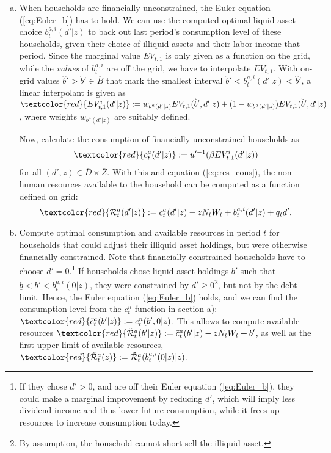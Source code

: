 \documentclass[11pt]{article} %
\newcounter{break}
\begin{document}
\begin{enumerate}[a.)]
\setcounter{enumi}{\value{break}}
\item When households are financially unconstrained, the Euler equation (\ref{eq:Euler_b}) has to hold. We can use the computed optimal liquid asset choice $b_t^{a,i}(d'|z)$ to back out last period's consumption level of these households, given their choice of illiquid assets and their labor income that period. Since the marginal value $EV_{t,1}$ is only given as a function on the grid, while the \textit{values} of $b_t^{a,i}$ are off the grid, we have to interpolate $EV_{t,1}$. With on-grid values $\hat{b}'>\check{b}'\in\overline{B}$ that mark the smallest interval $\check{b}'<b_t^{a,i}(d'|z)<\hat{b}'$, a linear interpolant is given as $\textcolor{red}{EV^i_{t,1}(d'|z)} := w_{b^a(d'|z)} EV_{t,1}(\hat{b}',d'|z) + (1-w_{b^a(d'|z)})EV_{t,1}(\check{b}',d'|z)$, where weights $w_{b^a(d'|z)}$ are suitably defined.

Now, calculate the consumption of financially unconstrained households as
\begin{equation}
\textcolor{red}{c^a_t(d'|z)} := u'^{-1}(\beta EV^i_{t,1}(d'|z))
\end{equation}
for all $(d',z)\in \overline{D}\times\overline{Z}$. With this and equation (\ref{eq:res_cons}), the non-human resources available to the household can be computed as a function defined on grid:
\begin{equation}
\textcolor{red}{\mathcal{R}^a_t(d'|z)} := c^a_t(d'|z) - zN_tW_t + b_t^{a,i}(d'|z) + q_t d'.
\end{equation}
\item Compute optimal consumption and available resources in period $t$ for households that could adjust their illiquid asset holdings, but were otherwise financially constrained. Note that financially constrained households have to choose $d'=0$.\footnote{If they chose $d'>0$, and are off their Euler equation (\ref{eq:Euler_b}), they could make a marginal improvement by reducing $d'$, which will imply less dividend income and thus lower future consumption, while it frees up resources to increase consumption today.} If households chose liquid asset holdings $b'$ such that $\underline{b} < b'<b^{a,i}_t(0|z)$, they were constrained by $d'\geq 0$\footnote{By assumption, the household cannot short-sell the illiquid asset.}, but not by the debt limit. Hence, the Euler equation (\ref{eq:Euler_b}) holds, and we can find the consumption level from the $c^n_t$-function in section a): $\textcolor{red}{\tilde{c}_t^a(b'|z)} := c^n_t(b',0|z)$. This allows to compute available resources $\textcolor{red}{\tilde{\mathcal{R}}_t^a(b'|z)} := \tilde{c}^a_t(b'|z) - zN_tW_t + b'$, as well as the first upper limit of available resources, $\textcolor{red}{\hat{\mathcal{R}}^a_t(z)} := \tilde{\mathcal{R}}^a_t(b^{a,i}_t(0|z)|z)$.


\end{enumerate}
\end{document}

